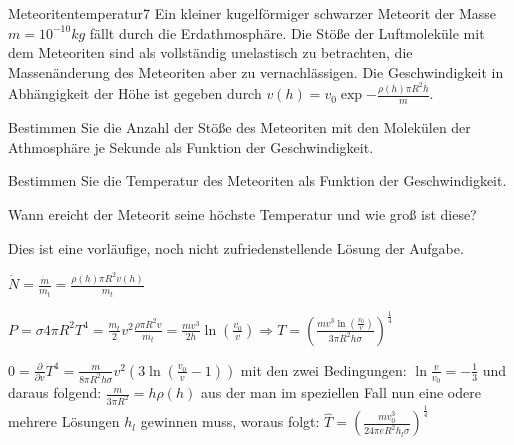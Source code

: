\begin{problem}{Meteoritentemperatur}{7}
Ein kleiner kugelförmiger schwarzer Meteorit der Masse $m=10^{-10}\unit{kg}$ fällt durch die Erdathmosphäre.
Die Stöße der Luftmoleküle mit dem Meteoriten sind als vollständig unelastisch zu betrachten, die Massenänderung des Meteoriten aber zu vernachlässigen.
Die Geschwindigkeit in Abhängigkeit der Höhe ist gegeben durch $v(h)=v_0\exp{-\frac{\rho(h)\pi R^2h}{m}}$.
 \begin{abcenum}
  \item Bestimmen Sie die Anzahl der Stöße des Meteoriten mit den Molekülen der Athmosphäre je Sekunde als Funktion der Geschwindigkeit.
  \item Bestimmen Sie die Temperatur des Meteoriten als Funktion der Geschwindigkeit.
  \item Wann ereicht der Meteorit seine höchste Temperatur und wie groß ist diese?
 \end{abcenum}
\begin{solution}
Dies ist eine vorläufige, noch nicht zufriedenstellende Lösung der Aufgabe.
\begin{abcenum}
\item $\dot{N}=\frac{\dot{m}}{m_t}=\frac{\rho(h) \pi R^2 v(h)}{m_t}$
\item $P=\sigma 4\pi R^2 T^4=\frac{m_t}2v^2\frac{\rho \pi R^2 v}{m_t}=\frac{mv^3}{2h}\ln{\left(\frac{v_0}{v}\right)} \Rightarrow T=\left(\frac{mv^3\ln{\left(\frac{v_0}{v}\right)}}{3\pi R^2h\sigma}\right)^{\frac 14}$
\item  $0=\frac {\partial}{\partial v}T^4=\frac{m}{8\pi R^2h\sigma}v^2\left(3\ln\left(\frac{v_0}{v}-1\right)\right)$ mit den zwei Bedingungen: $\ln\frac{v}{v_0}=-\frac 13$ und daraus folgend: $\frac{m}{3\pi R^2}=h\rho(h)$ aus der man im speziellen Fall nun eine odere mehrere Lösungen $h_l$ gewinnen muss, woraus folgt: $\hat{T}=\left(\frac{mv_0^3}{24\pi e R^2h_l\sigma}\right)^{\frac 14}$
\end{abcenum}
\end{solution}
\end{problem}

